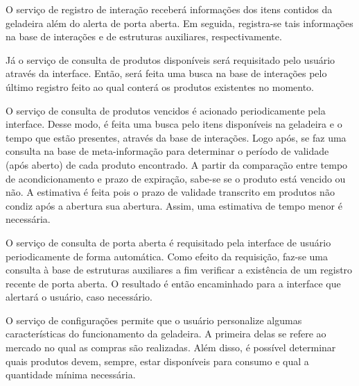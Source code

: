 
O serviço de registro de interação receberá informações dos itens contidos da geladeira além do alerta de porta aberta. Em seguida, registra-se tais informações na base de interações e de estruturas auxiliares, respectivamente.



Já o serviço de consulta de produtos disponíveis será requisitado pelo usuário através da interface. Então, será feita uma busca na base de interações pelo último registro feito ao qual conterá os produtos existentes no momento.


O serviço de consulta de produtos vencidos é acionado periodicamente pela interface. Desse modo, é feita uma busca pelo itens disponíveis na geladeira e o tempo que estão presentes, através da base de interações. Logo após, se faz uma consulta na base de meta-informação para determinar o período de validade (após aberto) de cada produto encontrado. A partir da comparação entre tempo de acondicionamento e prazo de expiração, sabe-se se o produto está vencido ou não. A estimativa é feita pois o prazo de validade transcrito em produtos não condiz após a abertura sua abertura. Assim, uma estimativa de tempo menor é necessária.

O serviço de consulta de porta aberta é requisitado pela interface de usuário periodicamente de forma automática. Como efeito da requisição, faz-se uma consulta à base de estruturas auxiliares a fim verificar a existência de um registro recente de porta aberta. O resultado é então encaminhado para a interface que alertará o usuário, caso necessário.



O serviço de configurações permite que o usuário personalize algumas características do funcionamento da geladeira. A primeira delas se refere ao mercado no qual as compras são realizadas. Além disso, é possível determinar quais produtos devem, sempre, estar disponíveis para consumo e qual a quantidade mínima necessária.

